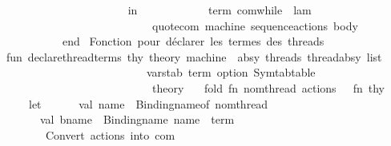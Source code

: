 \begin{isabellebody}
\ \ \ \ \ \ \ \ \ \ \ \isanewline
\ \ \ \ \ \ \ \ \ \ in\isanewline
\ \ \ \ \ \ \ \ \ \ \ \ {\isacharat}{\kern0pt}{\isacharbraceleft}{\kern0pt}term\ com{\isachardot}{\kern0pt}while{\isacharbraceright}{\kern0pt}\ {\isachardollar}{\kern0pt}\ lam\ \isanewline
\ \ \ \ \ \ \ \ \ \ \ \ \ \ \ \ \ \ \ \ \ \ \ \ \ {\isachardollar}{\kern0pt}\ quote{\isacharunderscore}{\kern0pt}com\ machine\ {\isacharparenleft}{\kern0pt}sequence{\isacharunderscore}{\kern0pt}actions\ body{\isacharparenright}{\kern0pt}\isanewline
\ \ \ \ \ \ \ \ \ \ end\isanewline
{\isacartoucheclose}\isanewline
\isanewline
{}\isamarkupfalse%
{\isacartoucheopen}\isanewline
{\isacharparenleft}{\kern0pt}{\isacharasterisk}{\kern0pt}\ Fonction\ pour\ déclarer\ les\ termes\ des\ threads\ {\isacharasterisk}{\kern0pt}{\isacharparenright}{\kern0pt}\isanewline
fun\ declare{\isacharunderscore}{\kern0pt}thread{\isacharunderscore}{\kern0pt}terms\ {\isacharparenleft}{\kern0pt}thy{\isacharcolon}{\kern0pt}\ theory{\isacharparenright}{\kern0pt}\ {\isacharparenleft}{\kern0pt}machine\ {\isacharcolon}{\kern0pt}\ absy{\isacharparenright}{\kern0pt}\ {\isacharparenleft}{\kern0pt}threads{\isacharcolon}{\kern0pt}\ thread{\isacharunderscore}{\kern0pt}absy\ list{\isacharparenright}{\kern0pt}\isanewline
\ \ \ \ \ \ \ \ \ \ \ \ \ \ \ \ \ \ \ \ \ \ \ \ \ {\isacharparenleft}{\kern0pt}varstab{\isacharcolon}{\kern0pt}\ {\isacharparenleft}{\kern0pt}term\ option{\isacharparenright}{\kern0pt}\ Symtab{\isachardot}{\kern0pt}table{\isacharparenright}{\kern0pt}\isanewline
\ \ \ \ \ \ \ \ \ \ \ \ \ \ \ \ \ \ \ \ \ \ \ \ \ {\isacharcolon}{\kern0pt}\ theory\ {\isacharequal}{\kern0pt}\isanewline
\ \ fold\ {\isacharparenleft}{\kern0pt}fn\ {\isacharbraceleft}{\kern0pt}nom{\isacharunderscore}{\kern0pt}thread{\isacharcomma}{\kern0pt}\ actions{\isacharcomma}{\kern0pt}\ {\isachardot}{\kern0pt}{\isachardot}{\kern0pt}{\isachardot}{\kern0pt}{\isacharbraceright}{\kern0pt}\ {\isacharequal}{\kern0pt}{\isachargreater}{\kern0pt}\ fn\ thy{\isacharprime}{\kern0pt}\ {\isacharequal}{\kern0pt}{\isachargreater}{\kern0pt}\isanewline
\ \ \ \ let\isanewline
\ \ \ \ \ \ val\ name\ {\isacharequal}{\kern0pt}\ Binding{\isachardot}{\kern0pt}name{\isacharunderscore}{\kern0pt}of\ nom{\isacharunderscore}{\kern0pt}thread\isanewline
\ \ \ \ \ \ val\ bname\ {\isacharequal}{\kern0pt}\ Binding{\isachardot}{\kern0pt}name\ {\isacharparenleft}{\kern0pt}name\ {\isacharcircum}{\kern0pt}\ {\isachardoublequote}{\kern0pt}{\isacharunderscore}{\kern0pt}term{\isachardoublequote}{\kern0pt}{\isacharparenright}{\kern0pt}\isanewline
\isanewline
\ \ \ \ \ \ {\isacharparenleft}{\kern0pt}{\isacharasterisk}{\kern0pt}\ Convert\ actions\ into\ com\ {\isacharasterisk}{\kern0pt}{\isacharparenright}{\kern0pt}\isanewline

\end{isabellebody}
